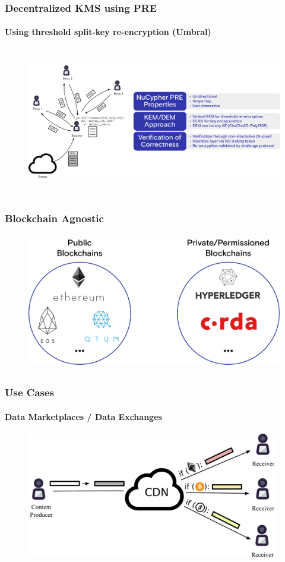 \documentclass[xetex,mathsans,sans,aspectratio=169]{beamer}
\begin{document}
    \begin{frame}
        \frametitle{Decentralized KMS using PRE}
        \framesubtitle{Using threshold split-key re-encryption (Umbral)}
        \begin{figure}
            \centering
            \includegraphics[height=6.5cm]{pdf/decrypt-umbral-with-note.pdf}
        \end{figure}
    \end{frame}

    \begin{frame}
        \frametitle{Blockchain Agnostic}
        \begin{figure}
            \centering
            \includegraphics[height=6cm]{pdf/blockchains.pdf}
        \end{figure}
    \end{frame}

    \begin{frame}
        \frametitle{Use Cases}
        \framesubtitle{Data Marketplaces / Data Exchanges}
        \begin{figure}
            \centering
            \includegraphics[height=5.5cm]{pdf/content-multi-currency.pdf}
        \end{figure}
    \end{frame}
\end{document}
